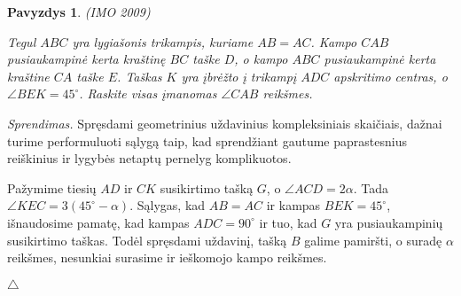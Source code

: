 \documentclass[11pt,a4paper,twoside]{book}
\newenvironment{sprendimas}{\noindent \textit{Sprendimas.}}{\hfill $\triangle$}
\newcounter{foo}[subsection]
\newtheorem{pavnr}[foo]{Pavyzdys}
\theoremstyle{definition} \newtheorem*{api}{Apibrėžimas}
\theoremstyle{remark} \newtheorem*{pastaba}{Pastaba}
\begin{document}
\begin{pavnr}
(IMO 2009)

Tegul $ABC$ yra lygiašonis trikampis, kuriame $AB =
AC$. Kampo $CAB$ pusiaukampinė kerta kraštinę $BC$ taške $D$, o kampo
$ABC$ pusiaukampinė kerta kraštine $CA$ taške $E$. Taškas $K$ yra įbrėžto
į trikampį $ADC$ apskritimo centras, o $\angle BEK = 45^{\circ}$. Raskite visas
įmanomas $\angle CAB$ reikšmes.
\end{pavnr}
\begin{sprendimas}
Spręsdami geometrinius uždavinius kompleksiniais skaičiais, dažnai turime performuluoti sąlygą taip, kad sprendžiant gautume paprastesnius reiškinius ir lygybės netaptų pernelyg komplikuotos. 

Pažymime tiesių $AD$ ir $CK$ susikirtimo tašką $G$, o $\angle ACD = 2\alpha$. Tada $\angle KEC=3(45^{\circ}-\alpha).$ Sąlygas, kad $AB=AC$ ir kampas $BEK=45^\circ$, išnaudosime pamatę, kad kampas $ADC=90^\circ$ ir tuo, kad $G$ yra pusiaukampinių susikirtimo taškas. Todėl spręsdami uždavinį, tašką $B$ galime pamiršti, o suradę $\alpha$ reikšmes, nesunkiai surasime ir ieškomojo kampo reikšmes.


\end{sprendimas}
\end{document}
